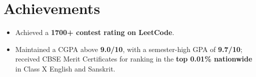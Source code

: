 \documentclass[a4paper,10pt]{article}
\begin{document}

\section{Achievements}

\begin{itemize}
  \item Achieved a \textbf{1700+ contest rating on LeetCode}.

  \item Maintained a CGPA above \textbf{9.0/10}, with a semester-high GPA of
  \textbf{9.7/10}; received CBSE Merit Certificates for ranking in the
  \textbf{top 0.01\% nationwide} in Class X English and Sanskrit.
\end{itemize}
\end{document}
